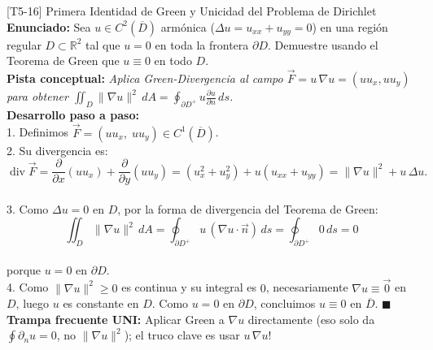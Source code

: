\documentclass[11pt,a4paper]{article}
\begin{document}
\begin{ejerciciobox}{[T5-16] Primera Identidad de Green y Unicidad del Problema de Dirichlet}
\textbf{Enunciado:} Sea $u \in C^2(\overline{D})$ armónica ($\Delta u = u_{xx} + u_{yy} = 0$) en una región regular $D \subset \mathbb{R}^2$ tal que $u = 0$ en toda la frontera $\partial D$. Demuestre usando el Teorema de Green que $u \equiv 0$ en todo $D$.\\[0.2cm]
\textbf{Pista conceptual:} \emph{Aplica Green-Divergencia al campo $\vec{F} = u\,\nabla u = (u u_x, u u_y)$ para obtener $\iint_D \|\nabla u\|^2\,dA = \oint_{\partial D^+} u\frac{\partial u}{\partial n}\,ds$.}\\[0.2cm]
\textbf{Desarrollo paso a paso:}\\
1. Definimos $\vec{F} = (u u_x,\; u u_y) \in C^1(\overline{D})$.\\
2. Su divergencia es:\\
$$\operatorname{div}\vec{F} = \frac{\partial}{\partial x}(u u_x) + \frac{\partial}{\partial y}(u u_y) = (u_x^2 + u_y^2) + u(u_{xx} + u_{yy}) = \|\nabla u\|^2 + u\,\Delta u.$$\\
3. Como $\Delta u = 0$ en $D$, por la forma de divergencia del Teorema de Green:\\
$$\iint_D \|\nabla u\|^2\,dA = \oint_{\partial D^+} u\,(\nabla u \cdot \vec{n})\,ds = \oint_{\partial D^+} 0\,ds = 0$$\\
porque $u = 0$ en $\partial D$.\\
4. Como $\|\nabla u\|^2 \ge 0$ es continua y su integral es $0$, necesariamente $\nabla u \equiv \vec{0}$ en $D$, luego $u$ es constante en $D$. Como $u = 0$ en $\partial D$, concluimos $u \equiv 0$ en $\overline{D}$. $\blacksquare$\\[0.2cm]
\textbf{Trampa frecuente UNI:} Aplicar Green a $\nabla u$ directamente (eso solo da $\oint \partial_n u = 0$, no $\|\nabla u\|^2$); el truco clave es usar $u\,\nabla u$!
\end{ejerciciobox}
\end{document}
